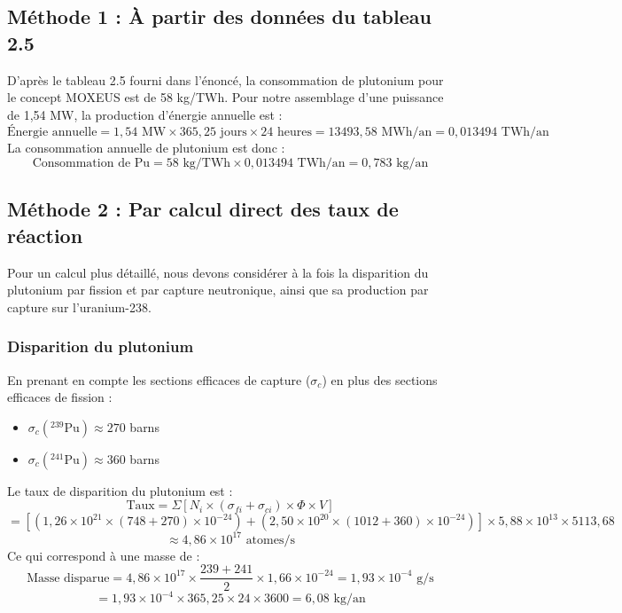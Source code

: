 \documentclass{article}
\begin{document}
\subsection{Méthode 1 : À partir des données du tableau 2.5}
D'après le tableau 2.5 fourni dans l'énoncé, la consommation de plutonium pour le concept MOXEUS est de 58 kg/TWh.
Pour notre assemblage d'une puissance de 1,54 MW, la production d'énergie annuelle est :
\begin{equation}
  \text{Énergie annuelle} = 1,54 \text{ MW} \times 365,25 \text{ jours} \times 24 \text{ heures} = 13 493,58 \text{ MWh/an} = 0,013494 \text{ TWh/an}
\end{equation}
La consommation annuelle de plutonium est donc :
\begin{equation}
  \text{Consommation de Pu} = 58 \text{ kg/TWh} \times 0,013494 \text{ TWh/an} = 0,783 \text{ kg/an}
\end{equation}

\subsection{Méthode 2 : Par calcul direct des taux de réaction}
Pour un calcul plus détaillé, nous devons considérer à la fois la disparition du plutonium par fission et par capture neutronique, ainsi que sa production par capture sur l'uranium-238.

\subsubsection{Disparition du plutonium}
En prenant en compte les sections efficaces de capture ($\sigma_c$) en plus des sections efficaces de fission :
\begin{itemize}
  \item $\sigma_c(^{239}\text{Pu}) \approx 270$ barns
  \item $\sigma_c(^{241}\text{Pu}) \approx 360$ barns
\end{itemize}
Le taux de disparition du plutonium est :
\begin{equation}
  \text{Taux} = \Sigma [N_i \times (\sigma_{fi} + \sigma_{ci}) \times \Phi \times V]
\end{equation}
\begin{equation}
  = [(1,26 \times 10^{21} \times (748 + 270) \times 10^{-24}) + (2,50 \times 10^{20} \times (1012 + 360) \times 10^{-24})] \times 5,88 \times 10^{13} \times 5 113,68
\end{equation}
\begin{equation}
  \approx 4,86 \times 10^{17} \text{ atomes/s}
\end{equation}
Ce qui correspond à une masse de :
\begin{equation}
  \text{Masse disparue} = 4,86 \times 10^{17} \times \frac{239 + 241}{2} \times 1,66 \times 10^{-24} = 1,93 \times 10^{-4} \text{ g/s}
\end{equation}
\begin{equation}
  = 1,93 \times 10^{-4} \times 365,25 \times 24 \times 3600 = 6,08 \text{ kg/an}
\end{equation}
\end{document}

